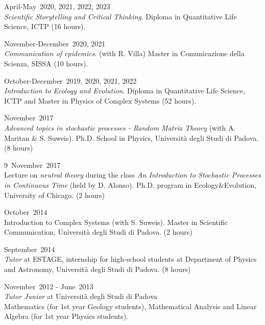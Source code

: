 \documentclass[10pt]{article}
\begin{document}
\begin{outerlist}



    \item[] April-May~2020, 2021, 2022, 2023 \\
	\emph{Scientific Storytelling and Critical Thinking}.
    Diploma in Quantitative Life Science, ICTP (16 hours).

    \item[] November-December~2020, 2021 \\
	\emph{Communication of epidemics}. (with R. Villa)
    Master in Comunicazione della Scienza, SISSA  (10 hours).


    \item[] October-December~2019, 2020, 2021, 2022 \\
	\emph{Introduction to Ecology and Evolution}.
    Diploma in Quantitative Life Science, ICTP and Master in Physics of Complex Systems (52 hours).

    \item[] November~2017 \\
	\emph{Advanced topics in stochastic processes - Random Matrix Theory} (with A. Maritan \& S. Suweis). 
    Ph.D. School in Physics, Universit\`a degli Studi di Padova. (8 hours)

    \item[] 9~November~2017 \\
	Lecture on \emph{neutral theory} during the class \emph{An Introduction to Stochastic Processes in Continuous Time} (held by D. Alonso). 
    Ph.D. program in Ecology\&Evolution, University of Chicago. (2 hours)

    \item[] October~2014 \\
	Introduction to Complex Systems (with S. Suweis). 
    Master in Scientific Communication, Universit\`a degli Studi di Padova. (2 hours)

    \item[] September~2014 \\
	 \emph{Tutor} at ESTAGE, internship for high-school students at Department of Physics and Astronomy,
    Universit\`a degli Studi di Padova. (8 hours)

    \item[] November~2012 - June~2013 \\
	 \emph{Tutor Junior} at Universit\`a degli Studi di Padova\\
	Mathematics (for 1st year Geology students),
	Mathematical Analysis and Linear Algebra (for 1st year Physics students). 

\end{outerlist}
\end{document}
